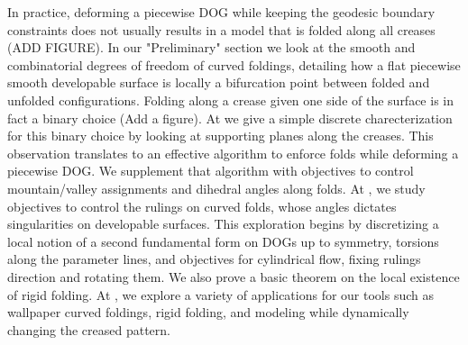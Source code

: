 In practice, deforming a piecewise DOG while keeping the geodesic boundary constraints does not usually results in a model that is folded along all creases (ADD FIGURE). In our "Preliminary" section we look at the smooth and combinatorial degrees of freedom of curved foldings, detailing how a flat piecewise smooth developable surface is locally a bifurcation point between folded and unfolded configurations. Folding along a crease given one side of the surface is in fact a binary choice (Add a figure). At  we give a simple discrete charecterization for this binary choice by looking at supporting planes along the creases. This observation translates to an effective algorithm to enforce folds while deforming a piecewise DOG. We supplement that algorithm with objectives to control mountain/valley assignments and dihedral angles along folds. At , we study objectives to control the rulings on curved folds, whose angles dictates singularities on developable surfaces. This exploration begins by discretizing a local notion of a second fundamental form on DOGs up to symmetry, torsions along the parameter lines, and objectives for cylindrical flow, fixing rulings direction and rotating them. We also prove a basic theorem on the local existence of rigid folding. At , we explore a variety of applications for our tools such as wallpaper curved foldings, rigid folding, and modeling while dynamically changing the creased pattern.
